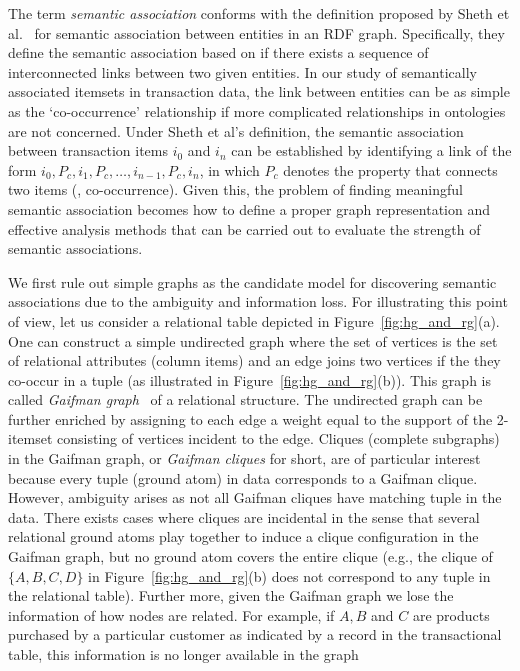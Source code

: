 The term \emph{semantic association} conforms with the definition proposed by Sheth et al.~\cite{ShethEtal05JDBM} for semantic association between entities in an RDF graph. Specifically, they define the semantic association based on if there exists a sequence of interconnected links between two given entities. In our study of semantically associated itemsets in transaction data, the link between entities can be as simple as the `co-occurrence' relationship if more complicated relationships in ontologies are not concerned. Under Sheth et al's definition, the semantic association between transaction items $i_0$ and $i_n$ can be established by identifying a link of the form $i_0, P_c, i_1, P_c, \ldots , i_{n-1}, P_c, i_n$, in which $P_c$ denotes the property that connects two items (\eg, co-occurrence). Given this, the problem of finding meaningful semantic association becomes how to define a proper graph representation and effective analysis methods that can be carried out to evaluate the strength of semantic associations.

We first rule out simple graphs as the candidate model for discovering semantic associations due to the ambiguity and information loss. For illustrating this point of view, let us consider a relational table depicted in Figure~\ref{fig:hg_and_rg}(a). One can construct a simple undirected graph where the set of vertices is the set of relational attributes (column items) and an edge joins two vertices if the they co-occur in a tuple (as illustrated in Figure~\ref{fig:hg_and_rg}(b)). This graph is called \emph{Gaifman graph}~\cite{Hodkinson02finiteconformal} of a relational structure. The undirected graph can be further enriched by assigning to each edge a weight equal to the support of the 2-itemset consisting of vertices incident to the edge. Cliques (complete subgraphs) in the Gaifman graph, or \emph{Gaifman cliques} for short, are of particular interest because every tuple (ground atom) in data corresponds to a Gaifman clique. However, ambiguity arises as not all Gaifman cliques have matching tuple in the data. There exists cases where cliques are incidental in the sense that several relational ground atoms play together to induce a clique configuration in the Gaifman graph, but no ground atom covers the entire clique (e.g., the clique of $\{A,B,C,D\}$ in Figure~\ref{fig:hg_and_rg}(b) does not correspond to any tuple in the relational table). Further more, given the Gaifman graph we lose the information of how nodes are related. For example, if $A, B$ and $C$ are products purchased by a particular customer as indicated by a record in the transactional table, this information is no longer available in the graph

